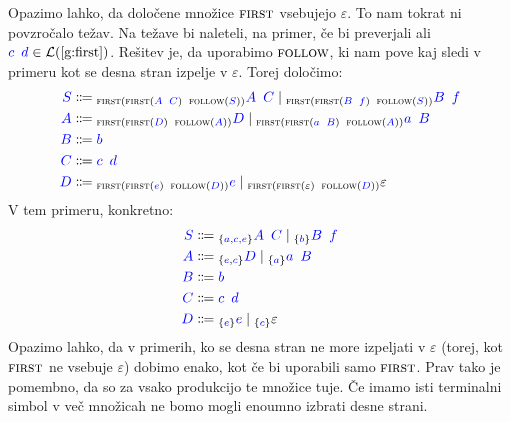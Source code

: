 \documentclass{article}
\newcommand{\FIRST}{\textsc{first}}
\newcommand{\FOLLOW}{\textsc{follow}}
\newcommand{\Symbol}[1]{\textcolor{blue}{#1}}
\newcommand{\Null}{\varepsilon}
\newcommand{\Language}[1]{\mathcal{L}(#1)}
\newcommand{\MathRef}[1]{\text{\ref{#1}}}
\newcommand{\Arrow}{\Coloneq}
\newcommand{\Seq}{{\ \,}}
\newcommand{\Union}{\mathrel{|}}
\newcommand{\Lookahead}[1]{{}_{\{{#1}\}}}
\newcommand{\Lk}[1]{{}_{{#1}}}
\begin{document}
Opazimo lahko, da določene množice $\FIRST$ vsebujejo $\Null$.
To nam tokrat ni povzročalo težav.
Na težave bi naleteli, na primer, če bi preverjali ali $\Symbol{c} \Seq \Symbol{d} \in \Language{\MathRef{g:first}}$.
Rešitev je, da uporabimo $\FOLLOW$, ki nam pove kaj sledi v primeru kot se desna stran izpelje v $\Null$.
Torej določimo:
\begin{equation*}
  \begin{aligned}
    \Symbol{S} &\Arrow \Lk{\FIRST(\FIRST(\Symbol{A} \Seq \Symbol{C}) \Seq \FOLLOW(\Symbol{S}))} \Symbol{A} \Seq \Symbol{C} \Union \Lk{\FIRST(\FIRST(\Symbol{B} \Seq \Symbol{f}) \Seq \FOLLOW(\Symbol{S}))} \Symbol{B} \Seq \Symbol{f} \\
    \Symbol{A} &\Arrow \Lk{\FIRST(\FIRST(\Symbol{D}) \Seq \FOLLOW(\Symbol{A}))} \Symbol{D} \Union \Lk{\FIRST(\FIRST(\Symbol{a} \Seq \Symbol{B}) \Seq \FOLLOW(\Symbol{A}))} \Symbol{a} \Seq \Symbol{B} \\
    \Symbol{B} &\Arrow \Symbol{b}\\
    \Symbol{C} &\Arrow \Symbol{c} \Seq \Symbol{d}\\
    \Symbol{D} &\Arrow \Lk{\FIRST(\FIRST(\Symbol{e}) \Seq \FOLLOW(\Symbol{D}))} \Symbol{e} \Union \Lk{\FIRST(\FIRST(\Null) \Seq \FOLLOW(\Symbol{D}))} \Null
  \end{aligned}
\end{equation*}
V tem primeru, konkretno:
\begin{equation*}
  \begin{aligned}
    \Symbol{S} &\Arrow \Lookahead{\Symbol{a}, \Symbol{c}, \Symbol{e}} \Symbol{A} \Seq \Symbol{C} \Union \Lookahead{\Symbol{b}} \Symbol{B} \Seq \Symbol{f} \\
    \Symbol{A} &\Arrow \Lookahead{\Symbol{e}, \Symbol{c}} \Symbol{D} \Union \Lookahead{\Symbol{a}} \Symbol{a} \Seq \Symbol{B} \\
    \Symbol{B} &\Arrow \Symbol{b}\\
    \Symbol{C} &\Arrow \Symbol{c} \Seq \Symbol{d}\\
    \Symbol{D} &\Arrow \Lookahead{\Symbol{e}} \Symbol{e} \Union \Lookahead{\Symbol{c}} \Null
  \end{aligned}
\end{equation*}
Opazimo lahko, da v primerih, ko se desna stran ne more izpeljati v $\Null$ (torej, kot $\FIRST$ ne vsebuje $\Null$) dobimo enako, kot če bi uporabili samo $\FIRST$.
Prav tako je pomembno, da so za vsako produkcijo te množice tuje.
Če imamo isti terminalni simbol v več množicah ne bomo mogli enoumno izbrati desne strani.
\end{document}
